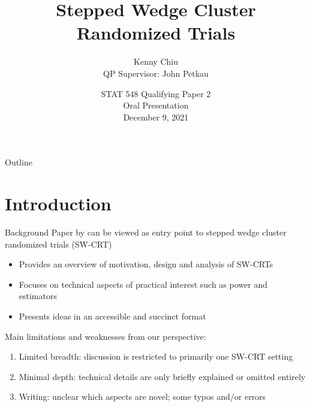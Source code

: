 \documentclass[9pt]{beamer}
\title{Stepped Wedge Cluster Randomized Trials}
\author[Kenny Chiu]{\large Kenny Chiu\\\vspace{0.5em} \footnotesize QP Supervisor: John Petkau}
\institute[]{\footnotesize The University of British Columbia\\Department of Statistics}
\date[August 24, 2021]{\large STAT 548 Qualifying Paper 2\\\normalsize Oral Presentation\\\vspace{0.5em}\footnotesize December 9, 2021}
\begin{document}
\begin{frame}
\titlepage
\end{frame}



\begin{frame}{Outline}
\tableofcontents
\end{frame}


\section{Introduction}



\begin{frame}{Background}
Paper by \citet{Hussey:2007} can be viewed as entry point to stepped wedge cluster randomized trials (SW-CRT)
\begin{itemize}

\item
Provides an overview of motivation, design and analysis of SW-CRTs

\item
Focuses on technical aspects of practical interest such as power and estimators

\item
Presents ideas in an accessible and succinct format

\end{itemize}
\vspace{2em}

Main limitations and weaknesses from our perspective:
\begin{enumerate}

\item
Limited breadth: discussion is restricted to primarily one SW-CRT setting

\item
Minimal depth: technical details are only briefly explained or omitted entirely

\item
Writing: unclear which aspects are novel; some typos and/or errors

\end{enumerate}
\end{frame}
\end{document}
